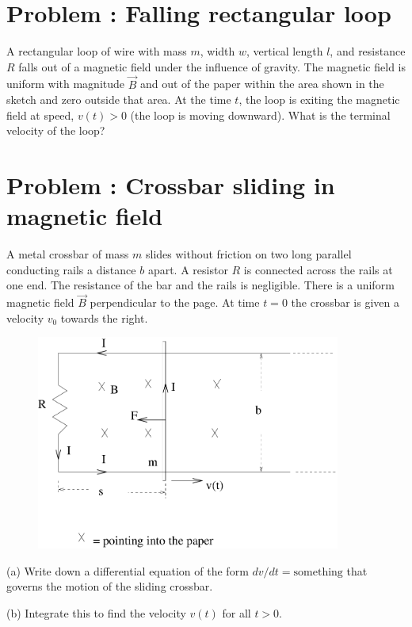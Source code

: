 \documentclass[problems]{esg8022pset}
\date{\today }
\begin{document}
\section{Problem \thesection: Falling rectangular loop}
  A rectangular loop of wire with mass $m$, width $w$, vertical length $l$, and resistance $R$ falls out of a magnetic field under the influence of gravity. The magnetic field is uniform with magnitude $\vec{B}$ and out of the paper within the area shown in the sketch  and
   zero outside that area. At the time $t$, the loop is exiting the magnetic field at speed, $v(t) > 0$ (the loop is
moving downward). What is the terminal velocity of the loop?
\section{Problem \thesection: Crossbar sliding in magnetic field}
A metal crossbar of mass $m$ slides without friction on two long parallel conducting rails a distance $b$ apart.
A resistor $R$ is connected across the rails at one end. The resistance of the bar and the rails is negligible.
There is a uniform magnetic field $\vec{B}$ perpendicular to the page. At time $t=0$ the crossbar is given a velocity
$v_0$ towards the right.

  \begin{figure}[H]
    \centering
    \includegraphics[width = 10cm]{faraday8}
    \label{fig:crossbar}
  \end{figure}

\par\noindent (a) Write down a differential equation of the form
$dv/dt = \mbox{something}$ that governs the motion of the sliding
crossbar.

\par\noindent (b) Integrate this to find the velocity $v(t)$ for all
$t > 0$.
\end{document}
